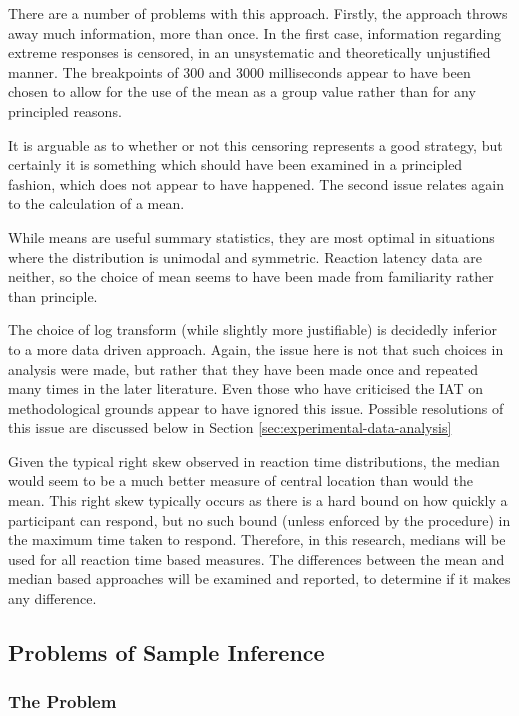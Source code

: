 There are a number of problems with this approach. Firstly, the approach throws away much information, more than once. In the first case, information regarding extreme responses is censored, in an unsystematic and theoretically unjustified manner. The breakpoints of 300 and 3000 milliseconds appear to have been chosen to allow for the use of the mean as a group value rather than for any principled reasons. 

It is arguable as to whether or not this censoring represents a good strategy, but certainly it is something which should have been examined in a principled fashion, which does not appear to have happened. The second issue relates again to the calculation of a mean.

While means are useful summary statistics, they are most optimal in situations where the distribution is unimodal and symmetric\cite{venables2002modern}. Reaction latency data are neither, so the choice of mean seems to have been made from familiarity rather than principle. 

The choice of log transform (while slightly more justifiable) is decidedly inferior to a more data driven approach. Again, the issue here is not that such choices in analysis were made, but rather that they have been made once and repeated many times in the later literature. Even those who have criticised the IAT \cite{Klauer2005,Mierke2003,Blanton2006} on methodological grounds appear to have ignored this issue. Possible resolutions of this issue are discussed below in Section \ref{sec:experimental-data-analysis}

Given the typical right skew observed in reaction time distributions, the median would seem to be a much better measure of central location than would the mean. This right skew typically occurs as there is a hard bound on how quickly a participant can respond, but no such bound (unless enforced by the procedure) in the maximum time taken to respond. Therefore, in this research, medians will be used for all reaction time based measures. The differences between the mean and median based approaches will be examined and reported, to determine if it makes any difference. 

\subsection{Problems of Sample Inference}
\label{sec:probl-sample-infer}
\subsubsection{The Problem}

